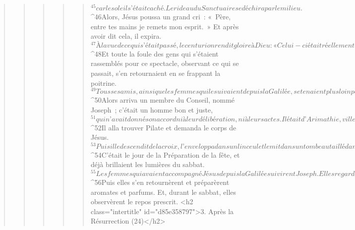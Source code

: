 \begin{verse}
\begin{verse}
\begin{verse}
\begin{verse}
\begin{verse}
${}^{45}car le soleil s’était caché. Le rideau du Sanctuaire se déchira par le milieu. 
${}^{46}Alors, Jésus poussa un grand cri : « Père, entre tes mains je remets mon esprit. » Et après avoir dit cela, il expira.
${}^{47}À la vue de ce qui s’était passé, le centurion rendit gloire à Dieu : « Celui-ci était réellement un homme juste. » 
${}^{48}Et toute la foule des gens qui s’étaient rassemblés pour ce spectacle, observant ce qui se passait, s’en retournaient en se frappant la poitrine.
${}^{49}Tous ses amis, ainsi que les femmes qui le suivaient depuis la Galilée, se tenaient plus loin pour regarder.
${}^{50}Alors arriva un membre du Conseil, nommé Joseph ; c’était un homme bon et juste, 
${}^{51}qui n’avait donné son accord ni à leur délibération, ni à leurs actes. Il était d’Arimathie, ville de Judée, et il attendait le règne de Dieu. 
${}^{52}Il alla trouver Pilate et demanda le corps de Jésus. 
${}^{53}Puis il le descendit de la croix, l’enveloppa dans un linceul et le mit dans un tombeau taillé dans le roc, où personne encore n’avait été déposé. 
${}^{54}C’était le jour de la Préparation de la fête, et déjà brillaient les lumières du sabbat.
${}^{55}Les femmes qui avaient accompagné Jésus depuis la Galilée suivirent Joseph. Elles regardèrent le tombeau pour voir comment le corps avait été placé. 
${}^{56}Puis elles s’en retournèrent et préparèrent aromates et parfums. Et, durant le sabbat, elles observèrent le repos prescrit.
      <h2 class="intertitle" id="d85e358797">3. Après la Résurrection (24)</h2>
      

\end{verse}
\end{verse}
\end{verse}
\end{verse}
\end{verse}
